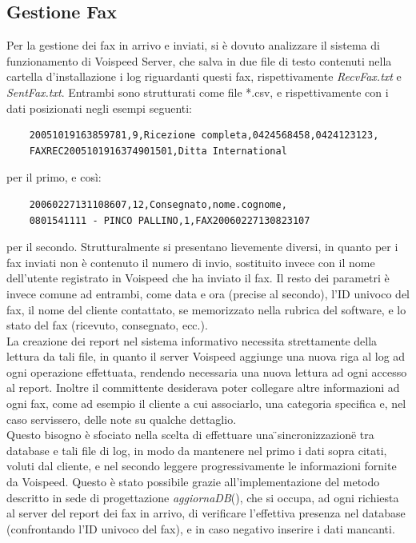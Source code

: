 \subsection{Gestione Fax}
Per la gestione dei fax in arrivo e inviati, si \`e dovuto analizzare il sistema di funzionamento di Voispeed Server, che salva in due file di testo contenuti nella cartella d'installazione i log riguardanti questi fax, rispettivamente \textit{RecvFax.txt} e \textit{SentFax.txt}. Entrambi sono strutturati come file *.csv, e rispettivamente con i dati posizionati negli esempi seguenti:
\begin{verbatim}
    20051019163859781,9,Ricezione completa,0424568458,0424123123,
    FAXREC2005101916374901501,Ditta International
\end{verbatim} 
per il primo, e cos\`i:
\begin{verbatim}
    20060227131108607,12,Consegnato,nome.cognome,
    0801541111 - PINCO PALLINO,1,FAX20060227130823107
\end{verbatim} 
\noindent per il secondo.
Strutturalmente si presentano lievemente diversi, in quanto per i fax inviati non \`e contenuto il numero di invio, sostituito invece con il nome dell'utente registrato in Voispeed che ha inviato il fax. Il resto dei parametri \`e invece comune ad entrambi, come data e ora (precise al secondo), l'ID univoco del fax, il nome del cliente contattato, se memorizzato nella rubrica del software, e lo stato del fax (ricevuto, consegnato, ecc.). \\
La creazione dei report nel sistema informativo necessita strettamente della lettura da tali file, in quanto il server Voispeed aggiunge una nuova riga al log ad ogni operazione effettuata, rendendo necessaria una nuova lettura ad ogni accesso al report. Inoltre il committente desiderava poter collegare altre informazioni ad ogni fax, come ad esempio il cliente a cui associarlo, una categoria specifica e, nel caso servissero, delle note su qualche dettaglio. \\
Questo bisogno \`e sfociato nella scelta di effettuare una \"{}sincronizzazione\"{} tra database e tali file di log, in modo da mantenere nel primo i dati sopra citati, voluti dal cliente, e nel secondo leggere progressivamente le informazioni fornite da Voispeed. Questo \`e stato possibile grazie all'implementazione del metodo descritto in sede di progettazione \textit{aggiornaDB}(), che si occupa, ad ogni richiesta al server del report dei fax in arrivo, di verificare l'effettiva presenza nel database (confrontando l'ID univoco del fax), e in caso negativo inserire i dati mancanti. 

